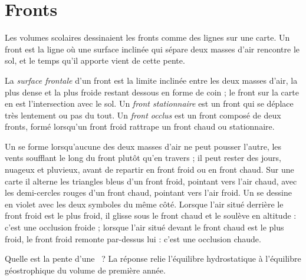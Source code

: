 \section{Fronts}\label{sec:b2:weather-systems:fronts}

Les volumes scolaires dessinaient les fronts comme des lignes sur une carte. Un front est la ligne où une
surface inclinée qui sépare deux masses d'air rencontre le sol, et le temps qu'il apporte vient de cette pente.

\begin{definition}\label{def:b2:weather-systems:fronts}
La \emph{surface frontale} d'un front est la limite inclinée entre les deux masses d'air,
la plus dense et la plus froide restant dessous en forme de coin ; le front sur la carte en est l'intersection avec le sol. Un
\emph{front stationnaire} est un front qui se déplace très lentement ou pas du tout. Un
\emph{front occlus} est un front composé de deux fronts, formé lorsqu'un front froid rattrape
un front chaud ou stationnaire.
\end{definition}

Un  se forme lorsqu'aucune des deux masses d'air ne peut pousser l'autre, les vents soufflant le long
du front plutôt qu'en travers ; il peut rester des jours, nuageux et pluvieux, avant de repartir en front froid
ou en front chaud. Sur une carte il alterne les triangles bleus d'un front froid, pointant vers l'air chaud, avec les
demi-cercles rouges d'un front chaud, pointant vers l'air froid. Un  se dessine en violet avec les deux
symboles du même côté. Lorsque l'air situé derrière le front froid est le plus froid, il glisse sous le front
chaud et le soulève en altitude : c'est une occlusion froide ; lorsque l'air situé devant le front chaud est le plus
froid, le front froid remonte par-dessus lui : c'est une occlusion chaude.

Quelle est la pente d'une ~? La réponse relie l'équilibre hydrostatique à l'équilibre géostrophique
du volume de première année.

